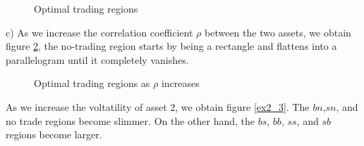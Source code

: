 \documentclass[10pt]{article}
\begin{document}
\begin{figure}[h]
    \centering
    \caption{Optimal trading regions}
    \label{ex2_1}    
\end{figure}

\bigbreak

c) As we increase the correlation coefficient $\rho$ between the two assets, we obtain figure \ref{ex2_2}, the no-trading region starts by being a rectangle and flattens into a parallelogram until it completely vanishes.

\begin{figure}[h]
    \centering
    \caption{Optimal trading regions as $\rho$ increases}
    \label{ex2_2}    
\end{figure}

As we increase the voltatility of asset 2, we obtain figure \ref{ex2_3}. The $bn$,$sn$, and no trade regions become slimmer. On the other hand, the $bs$, $bb$, $ss$, and $sb$ regions become larger.
\end{document}
